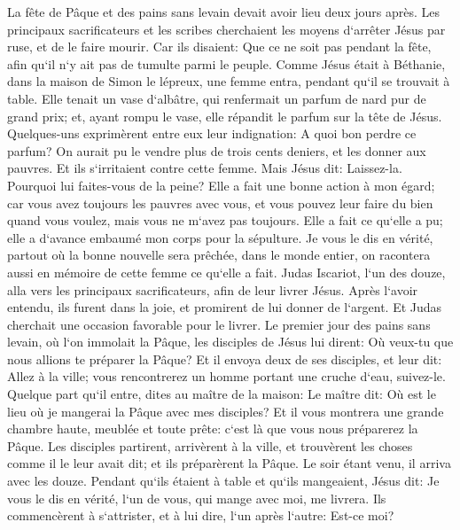 \verse La fête de Pâque et des pains sans levain devait avoir lieu deux jours après. Les principaux sacrificateurs et les scribes cherchaient les moyens d`arrêter Jésus par ruse, et de le faire mourir. 
\verse Car ils disaient: Que ce ne soit pas pendant la fête, afin qu`il n`y ait pas de tumulte parmi le peuple. 
\verse Comme Jésus était à Béthanie, dans la maison de Simon le lépreux, une femme entra, pendant qu`il se trouvait à table. Elle tenait un vase d`albâtre, qui renfermait un parfum de nard pur de grand prix; et, ayant rompu le vase, elle répandit le parfum sur la tête de Jésus. 
\verse Quelques-uns exprimèrent entre eux leur indignation: A quoi bon perdre ce parfum? 
\verse On aurait pu le vendre plus de trois cents deniers, et les donner aux pauvres. Et ils s`irritaient contre cette femme. 
\verse Mais Jésus dit: Laissez-la. Pourquoi lui faites-vous de la peine? Elle a fait une bonne action à mon égard; 
\verse car vous avez toujours les pauvres avec vous, et vous pouvez leur faire du bien quand vous voulez, mais vous ne m`avez pas toujours. 
\verse Elle a fait ce qu`elle a pu; elle a d`avance embaumé mon corps pour la sépulture. 
\verse Je vous le dis en vérité, partout où la bonne nouvelle sera prêchée, dans le monde entier, on racontera aussi en mémoire de cette femme ce qu`elle a fait. 
\verse Judas Iscariot, l`un des douze, alla vers les principaux sacrificateurs, afin de leur livrer Jésus. 
\verse Après l`avoir entendu, ils furent dans la joie, et promirent de lui donner de l`argent. Et Judas cherchait une occasion favorable pour le livrer. 
\verse Le premier jour des pains sans levain, où l`on immolait la Pâque, les disciples de Jésus lui dirent: Où veux-tu que nous allions te préparer la Pâque? 
\verse Et il envoya deux de ses disciples, et leur dit: Allez à la ville; vous rencontrerez un homme portant une cruche d`eau, suivez-le. 
\verse Quelque part qu`il entre, dites au maître de la maison: Le maître dit: Où est le lieu où je mangerai la Pâque avec mes disciples? 
\verse Et il vous montrera une grande chambre haute, meublée et toute prête: c`est là que vous nous préparerez la Pâque. 
\verse Les disciples partirent, arrivèrent à la ville, et trouvèrent les choses comme il le leur avait dit; et ils préparèrent la Pâque. 
\verse Le soir étant venu, il arriva avec les douze. 
\verse Pendant qu`ils étaient à table et qu`ils mangeaient, Jésus dit: Je vous le dis en vérité, l`un de vous, qui mange avec moi, me livrera. 
\verse Ils commencèrent à s`attrister, et à lui dire, l`un après l`autre: Est-ce moi? 
